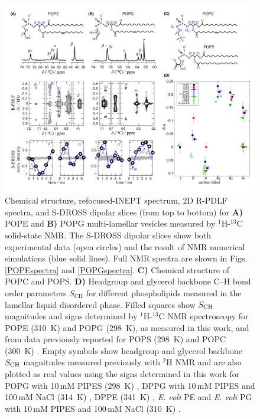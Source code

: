 \documentclass[journal=jpcbfk,manuscript=article]{achemso}
\begin{document}
\begin{figure}[]
  \centering
   \includegraphics[width=\textwidth]{./Figs/figure_PG_PE.pdf}
   \caption{\label{HGorderParameters}
     Chemical structure, refocused-INEPT spectrum, 2D R-PDLF spectra, and S-DROSS dipolar slices (from top to bottom) for \textbf{A)} POPE  and \textbf{B)} POPG multi-lamellar vesicles measured by $^1$H-$^{13}$C solid-state NMR. The S-DROSS dipolar slices show both experimental data (open circles) and the result of NMR numerical simulations (blue solid lines).
     Full NMR spectra are shown in Figs. \ref{POPEspectra} and \ref{POPGspectra}.
     \textbf{C)} Chemical structure of POPC and POPS.
    \textbf{D)} Headgroup and glycerol backbone C--H bond order parameters $S_\mathrm{CH}$ for different phospholipids measured in the lamellar liquid disordered phase.
    Filled squares show $S_{\rm{CH}}$ magnitudes and signs determined by $^1$H-$^{13}$C NMR spectroscopy for POPE (310~K) and POPG (298~K), as
    measured in this work, and from data previously reported for POPS (298~K) \cite{antila19} and POPC (300~K) \cite{ferreira13,ferreira16}. Empty symbols show headgroup and glycerol backbone $S_{\rm{CH}}$ magnitudes measured previously with $^2$H NMR and are also plotted as real values using the signs determined in this work for 
    POPG with 10\,mM PIPES (298~K) \cite{borle85},
    DPPG with 10\,mM PIPES and 100\,mM NaCl (314~K) \cite{wohlgemuth80}, 
    DPPE (341~K) \cite{seelig76},
    {\it E. coli} PE and {\it E. coli} PG with 10\,mM PIPES and 100\,mM NaCl (310~K) \cite{gally81}.
   }
\end{figure}
\end{document}
